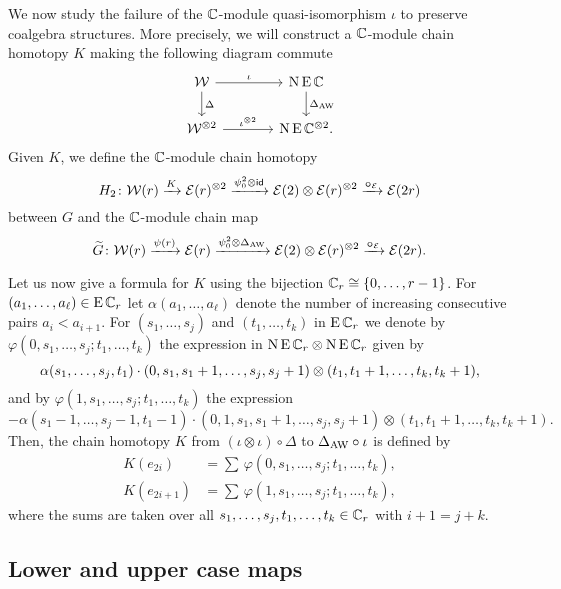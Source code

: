 We now study the failure of the $\mathbb{C}$-module quasi-isomorphism $\iota$ to preserve coalgebra structures.
More precisely, we will construct a $\mathbb{C}$-module chain homotopy $K$ making the following diagram commute
\begin{equation}\label{d:coproducts}
	\begin{tikzcd}[column sep=large]
			\cW \arrow[r,"\iota"] \arrow[d,"\Delta"] & \chains\EE\cyc \arrow[d,"\Delta_{\AW}"]\\
			\cW^{\ot 2} \arrow[r,"\iota^{\ot 2}"] & \chains\EE\cyc^{\ot 2}.
		\end{tikzcd}
\end{equation}
Given $K$, we define the $\mathbb{C}$-module chain homotopy
\[
H_2 \colon \mathcal{W}(r) \xrightarrow{K} \mathcal{E}(r)^{\otimes 2} \xrightarrow{\psi^2_0 \otimes \mathsf{id}} \mathcal{E}(2) \otimes \mathcal{E}(r)^{\otimes 2} \xrightarrow{\bm{\circ}_{\mathcal{E}}} \mathcal{E}(2r)
\]
between $G$ and the $\mathbb{C}$-module chain map
\[
\widetilde G \colon \mathcal{W}(r) \xrightarrow{\psi(r)} \mathcal{E}(r) \xrightarrow{\psi^2_0 \otimes \Delta_{\operatorname{AW}}} \mathcal{E}(2) \otimes \mathcal{E}(r)^{\otimes 2} \xrightarrow{\bm{\circ}_{\mathcal{E}}} \mathcal{E}(2r).
\]

Let us now give a formula for $K$ using the bijection $\mathbb{C}_r \cong \{0,\dots,r-1\}$.
For $(a_1,\dots,a_\ell) \in \operatorname{E}\mathbb{C}_r$ let $\alpha(a_1,\dots,a_\ell)$ denote the number of increasing consecutive pairs $a_i < a_{i+1}$.
For $(s_1,\dots,s_j)$ and $(t_1,\dots,t_k)$ in $\operatorname{E}\mathbb{C}_r$ we denote by $\varphi(0,s_1,\dots,s_j;t_1,\dots,t_k)$ the expression in $\operatorname{N} \operatorname{E} \mathbb{C}_r \otimes \operatorname{N} \operatorname{E} \mathbb{C}_r$ given by
\[
\alpha(s_1,\dots,s_j,t_1) \cdot
(0,s_1,s_1+1,\dots,s_j,s_j+1) \otimes
(t_1,t_1+1,\dots,t_k,t_k+1),
\]
and by $\varphi(1,s_1,\dots,s_j;t_1,\dots,t_k)$ the expression
\begin{equation*}
	- \alpha(s_1-1,\dots,s_j-1,t_1-1) \cdot
	(0,1,s_1,s_1+1,\dots,s_j,s_j+1)\otimes (t_1,t_1+1,\dots,t_k,t_k+1).
\end{equation*}
Then, the chain homotopy $K$ from $(\iota\otimes \iota) \circ \Delta$ to $\Delta_{\operatorname{AW}}\circ \iota$ is defined by
\[
\begin{split}
	K(e_{2i})   &= \sum \, \varphi(0,s_1,\dots,s_j;t_1,\dots,t_k), \\
	K(e_{2i+1}) &= \sum \, \varphi(1,s_1,\dots,s_j;t_1,\dots,t_k),
\end{split}
\]
where the sums are taken over all $s_1,\dots,s_j,t_1,\dots,t_k \in \mathbb{C}_r$ with $i+1 = j+k$.

\subsection{Lower and upper case maps}

